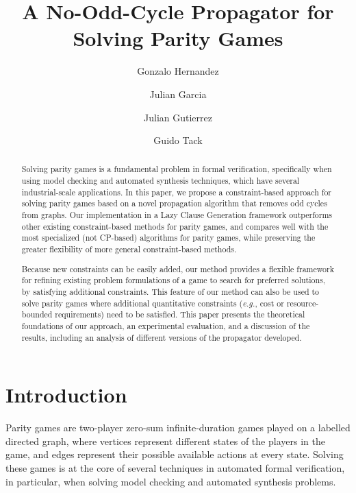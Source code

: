 \documentclass[a4paper,UKenglish,cleveref, autoref, thm-restate, anonymous]{lipics-v2021}
\title{A No-Odd-Cycle Propagator for Solving Parity Games} %
\author{Gonzalo Hernandez}{Monash University \and Universidad de Nariño}{gonzalo.hernandez@monash.edu\footnote{Also reachable at \texttt{gonzalo.hernandez@udenar.edu.co}}}{}{}
\author{Julian Garcia}{Monash University}{julian.garcia@monash.edu}{}{}
\author{Julian Gutierrez}{University of Sussex}{J.Gutierrez@sussex.ac.uk}{}{}
\author{Guido Tack}{Monash University \and OPTIMA ARC ITTC}{guido.tack@monash.edu}{}{}
\begin{document}
\maketitle

\begin{abstract}

Solving parity games is a fundamental problem in formal verification, specifically when using model checking and automated synthesis techniques, which have several industrial-scale applications. In this paper, we propose a constraint-based approach for solving parity games based on a novel propagation algorithm that removes odd cycles from graphs. Our implementation in a Lazy Clause Generation framework outperforms other existing constraint-based methods for parity games, and compares well with the most specialized (not CP-based) algorithms for parity games, while preserving the greater flexibility of more general constraint-based methods.

Because new constraints can be easily added, our method provides a flexible framework for refining existing problem formulations of a game to search for preferred solutions, by satisfying additional constraints. 
This feature of our method can also be used to solve parity games where additional quantitative constraints ({\em e.g.}, cost or resource-bounded requirements) need to be satisfied. 
%
This paper presents the theoretical foundations of our approach, an experimental evaluation, and a discussion of the results, including an analysis of different versions of the propagator developed.

\end{abstract}

\section{Introduction}

Parity games are two-player zero-sum infinite-duration games played on a labelled directed graph, where vertices represent different states of the players in the game, and edges represent their possible available actions at every state. 
Solving these games is at the core of several techniques in automated formal verification, in particular, when solving model checking and automated synthesis problems.
\end{document}
